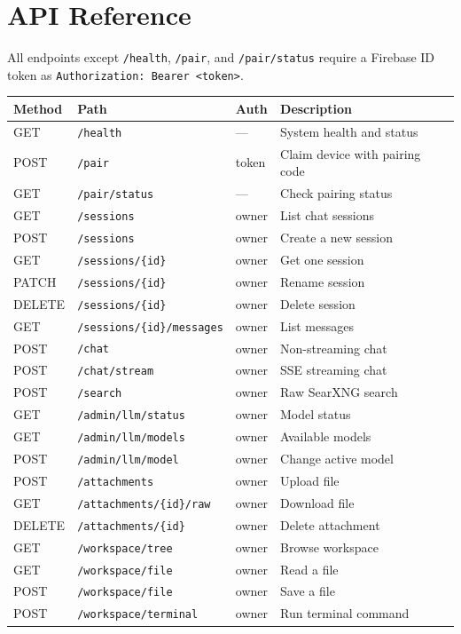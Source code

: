 \documentclass[a4paper,11pt,twoside]{report}
\begin{document}
\chapter{API Reference}

All endpoints except \texttt{/health}, \texttt{/pair}, and \texttt{/pair/status} require a Firebase ID token as \texttt{Authorization: Bearer <token>}.

\begin{center}\small
\begin{tabular}{@{}llll@{}}
\toprule
\textbf{Method} & \textbf{Path} & \textbf{Auth} & \textbf{Description} \\
\midrule
GET & \texttt{/health} & --- & System health and status \\
POST & \texttt{/pair} & token & Claim device with pairing code \\
GET & \texttt{/pair/status} & --- & Check pairing status \\
\midrule
GET & \texttt{/sessions} & owner & List chat sessions \\
POST & \texttt{/sessions} & owner & Create a new session \\
GET & \texttt{/sessions/\{id\}} & owner & Get one session \\
PATCH & \texttt{/sessions/\{id\}} & owner & Rename session \\
DELETE & \texttt{/sessions/\{id\}} & owner & Delete session \\
GET & \texttt{/sessions/\{id\}/messages} & owner & List messages \\
\midrule
POST & \texttt{/chat} & owner & Non-streaming chat \\
POST & \texttt{/chat/stream} & owner & SSE streaming chat \\
POST & \texttt{/search} & owner & Raw SearXNG search \\
\midrule
GET & \texttt{/admin/llm/status} & owner & Model status \\
GET & \texttt{/admin/llm/models} & owner & Available models \\
POST & \texttt{/admin/llm/model} & owner & Change active model \\
\midrule
POST & \texttt{/attachments} & owner & Upload file \\
GET & \texttt{/attachments/\{id\}/raw} & owner & Download file \\
DELETE & \texttt{/attachments/\{id\}} & owner & Delete attachment \\
\midrule
GET & \texttt{/workspace/tree} & owner & Browse workspace \\
GET & \texttt{/workspace/file} & owner & Read a file \\
POST & \texttt{/workspace/file} & owner & Save a file \\
POST & \texttt{/workspace/terminal} & owner & Run terminal command \\
\bottomrule
\end{tabular}
\end{center}
\end{document}
